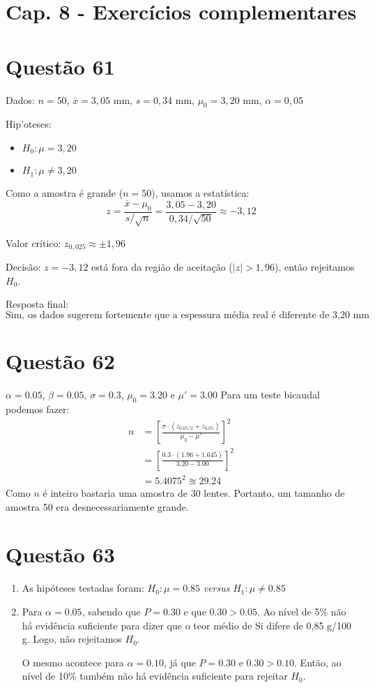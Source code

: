 \documentclass[12pt]{article}
\newcommand{\quest}[1]{\section*{Questão #1}} %
\begin{document}
\section{Cap. 8 - Exercícios complementares}

\quest{61}

Dados: $n = 50$, $\bar{x} = 3{,}05$ mm, $s = 0{,}34$ mm, $\mu_0 = 3{,}20$ mm, $\alpha = 0{,}05$

Hip'oteses:
\begin{itemize}
  \item $H_0: \mu = 3{,}20$
  \item $H_1: \mu \neq 3{,}20$
\end{itemize}

Como a amostra \'{e} grande ($n = 50$), usamos a estat\'istica:
\[
z = \frac{\bar{x} - \mu_0}{s / \sqrt{n}} = \frac{3{,}05 - 3{,}20}{0{,}34 / \sqrt{50}} \approx -3{,}12
\]

Valor cr\'itico: $z_{0{,}025} \approx \pm 1{,}96$

Decis\~ao: $z = -3{,}12$ est\'a fora da regi\~ao de aceita\c{c}\~ao ($|z| > 1{,}96$), ent\~ao rejeitamos $H_0$.

Resposta final:
\[
\boxed{\text{Sim, os dados sugerem fortemente que a espessura m\'edia real \'{e} diferente de 3{,}20 mm}}
\]

\quest{62}
$\alpha = 0.05$, $\beta =0.05$, $\sigma = 0.3$, $\mu_0 = 3.20$ e $\mu' = 3.00$
Para um teste bicaudal podemos fazer:
\begin{align*}
    n &= \left[ \frac{\sigma \cdot (z_{0.05/2} + z_{0.05})}{\mu_0-\mu'} \right]^2\\
      &= \left[ \frac{0.3 \cdot (1.96 + 1.645)}{3.20-3.00} \right]^2\\
      &= 5.4075^2 \approxeq 29.24
\end{align*}
Como $n$ é inteiro bastaria uma amostra de 30 lentes. Portanto, um tamanho de amostra 50 era desnecessariamente grande.

\quest{63}
\begin{enumerate}
    \item As hipóteses testadas foram: $H_0: \mu = 0.85$ \textit{versus} $H_1: \mu \ne 0.85$
    \item Para $\alpha = 0.05$, sabendo que $P=0.30$ e que $0.30 > 0.05$. Ao nível de 5\% não há evidência suficiente para dizer que o teor médio de Si difere de 0,85 g/100 g. Logo, não rejeitamos $H_0$.
    
    O mesmo acontece para $\alpha = 0.10$, já que $P=0.30$ e $0.30 > 0.10$. Então, ao nível de 10\% também não há evidência suficiente para rejeitar $H_0$.
\end{enumerate}
\end{document}
